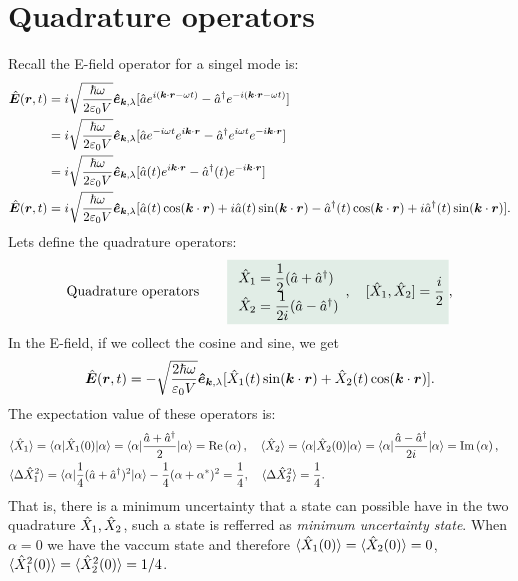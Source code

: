 \section{Quadrature operators}
Recall the E-field operator for a singel mode is:
\begin{align*}
    \hat{\bm{E}}(\bm{r},t)&=i\sqrt{\frac{\hbar\omega}{2\varepsilon_0V}}\bm{\hat{e}}_{\bm{k},\lambda}[\hat{a} e^{i(\bm{k}\cdot\bm{r}-\omega t)}-\hat{a}^\dagger e^{-i(\bm{k}\cdot\bm{r}-\omega t)}]\\
    &=i\sqrt{\frac{\hbar\omega}{2\varepsilon_0V}}\bm{\hat{e}}_{\bm{k},\lambda}[\hat{a} e^{-i\omega t} e^{i\bm{k}\cdot\bm{r}}-\hat{a}^\dagger e^{i\omega t} e^{-i\bm{k}\cdot\bm{r}}]\\
    &=i\sqrt{\frac{\hbar\omega}{2\varepsilon_0V}}\bm{\hat{e}}_{\bm{k},\lambda}[\hat{a}(t)e^{i\bm{k}\cdot\bm{r}}-\hat{a}^\dagger(t)e^{-i\bm{k}\cdot\bm{r}}]\\
    \hat{\bm{E}}(\bm{r},t)&=i\sqrt{\frac{\hbar\omega}{2\varepsilon_0V}}\bm{\hat{e}}_{\bm{k},\lambda}[\hat{a}(t)\cos(\bm{k}\cdot\bm{r})+i\hat{a}(t)\sin(\bm{k}\cdot\bm{r})-\hat{a}^\dagger(t)\cos(\bm{k}\cdot\bm{r})+i\hat{a}^\dagger(t)\sin(\bm{k}\cdot\bm{r})].
\end{align*}
Lets define the quadrature operators:
\begin{align}
    \text{Quadrature operators}\qquad\highlight{\begin{array}{l}
        \hX_1=\dfrac{1}{2}(\ha+\ha^\dagger)\\
        \hX_2=\dfrac{1}{2i}(\ha-\ha^\dagger)
    \end{array},\quad[\hX_1,\hX_2]=\frac{i}{2}},
    \label{eq:quadratureoperator_timeindependent}
\end{align}
In the E-field, if we collect the cosine and sine, we get
\begin{align*}
    \hat{\bm{E}}(\bm{r},t)=-\sqrt{\frac{2\hbar\omega}{\varepsilon_0V}}\bm{\hat{e}}_{\bm{k},\lambda}[\hat{X}_1(t)\sin(\bm{k}\cdot\bm{r})+\hat{X}_2(t)\cos(\bm{k}\cdot\bm{r})].
\end{align*}
The expectation value of these operators is:
\begin{align*}
    &\langle\hat{X}_1\rangle=\langle\alpha|\hat{X}_1(0)|\alpha\rangle=\langle\alpha|\frac{\hat{a}+\hat{a}^\dagger}{2}|\alpha\rangle=\text{Re}\left(\alpha\right),\quad
    \langle\hat{X}_2\rangle=\langle\alpha|\hat{X}_2(0)|\alpha\rangle=\langle\alpha|\frac{\hat{a}-\hat{a}^\dagger}{2i}|\alpha\rangle=\text{Im}\left(\alpha\right),\quad\\
    &\langle\Delta\hat{X}^2_1\rangle=\langle\alpha|\frac{1}{4}(\hat{a}+\hat{a}^\dagger)^2|\alpha\rangle-\frac{1}{4}(\alpha+\alpha^*)^2=\frac{1}{4},\quad\langle\Delta\hat{X}^2_2\rangle=\frac{1}{4}.
\end{align*}
That is, there is a minimum uncertainty that a state can possible have in the two quadrature $\hat{X}_1,\hat{X}_2$, such a state is refferred as 
\emph{minimum uncertainty state}.
When $\alpha=0$ we have the vaccum state and therefore $\langle\hat{X}_1(0)\rangle=\langle\hat{X}_2(0)\rangle=0$, $\langle\hat{X}_1^2(0)\rangle=\langle\hat{X}_2^2(0)\rangle=1/4$.

